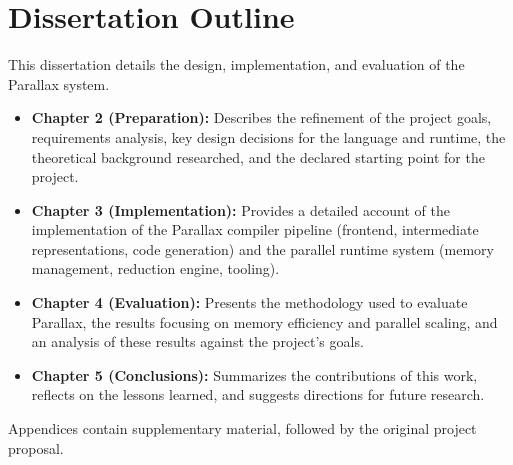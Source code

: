 \section{Dissertation Outline}
This dissertation details the design, implementation, and evaluation of the Parallax system. 
\begin{itemize}
    \item \textbf{Chapter 2 (Preparation):} Describes the refinement of the project goals, requirements analysis, key design decisions for the language and runtime, the theoretical background researched, and the declared starting point for the project.
    \item \textbf{Chapter 3 (Implementation):} Provides a detailed account of the implementation of the Parallax compiler pipeline (frontend, intermediate representations, code generation) and the parallel runtime system (memory management, reduction engine, tooling).
    \item \textbf{Chapter 4 (Evaluation):} Presents the methodology used to evaluate Parallax, the results focusing on memory efficiency and parallel scaling, and an analysis of these results against the project's goals.
    \item \textbf{Chapter 5 (Conclusions):} Summarizes the contributions of this work, reflects on the lessons learned, and suggests directions for future research.
\end{itemize}
Appendices contain supplementary material, followed by the original project proposal. 